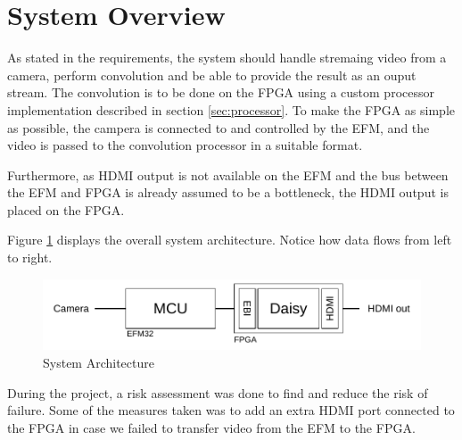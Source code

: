 \section{System Overview}
As stated in the requirements, the system should handle stremaing video from a camera, perform convolution and be able to provide the result as an ouput stream.
The convolution is to be done on the FPGA using a custom processor implementation described in section \ref{sec:processor}.
To make the FPGA as simple as possible, the campera is connected to and controlled by the EFM, and the video is passed to the convolution processor in a suitable format.

Furthermore, as HDMI output is not available on the EFM and the bus between the EFM and FPGA is already assumed to be a bottleneck, the HDMI output is placed on the FPGA.

Figure \ref{fig:systemArchitecture} displays the overall system architecture. Notice how data flows from left to right.

\begin{figure}[h!]
    \includegraphics[]{img/systemArchitecture.pdf}
    \caption{System Architecture}
    \label{fig:systemArchitecture}
\end{figure}

During the project, a risk assessment was done to find and reduce the risk of failure.
Some of the measures taken was to add an extra HDMI port connected to the FPGA in case we failed to transfer video from the EFM to the FPGA.
